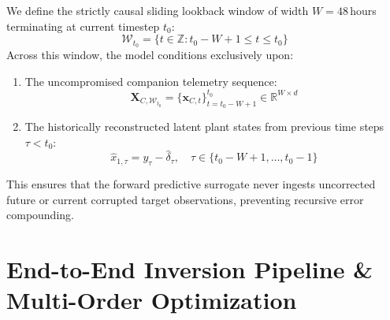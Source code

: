 \documentclass[11pt,a4paper]{article}
\begin{document}
We define the strictly causal sliding lookback window of width $W = 48$\,hours terminating at current timestep $t_0$:
\begin{equation}
\mathcal{W}_{t_0} = \{t \in \mathbb{Z} : t_0 - W + 1 \le t \le t_0\}
\end{equation}
Across this window, the model conditions exclusively upon:
\begin{enumerate}
    \item The uncompromised companion telemetry sequence:
    \begin{equation}
    \mathbf{X}_{C, \mathcal{W}_{t_0}} = \{\mathbf{x}_{C, t}\}_{t=t_0-W+1}^{t_0} \in \mathbb{R}^{W \times d}
    \end{equation}
    \item The historically reconstructed latent plant states from previous time steps $\tau < t_0$:
    \begin{equation}
    \hat{x}_{1, \tau} = y_\tau - \hat{\delta}_\tau, \quad \tau \in \{t_0 - W + 1, \dots, t_0 - 1\}
    \end{equation}
\end{enumerate}
This ensures that the forward predictive surrogate never ingests uncorrected future or current corrupted target observations, preventing recursive error compounding.


\section{End-to-End Inversion Pipeline \& Multi-Order Optimization}
\end{document}
